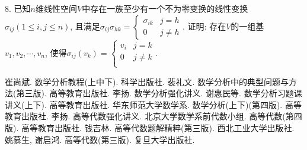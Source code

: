 \documentclass[12pt, a4paper, twoside]{ctexart}%
\begin{document}
	8. 已知$n$维线性空间$V$中存在一族至少有一个不为零变换的线性变换$\sigma_{ij}(1\leq i,j\leq n)$, 且满足$\sigma_{ij}\sigma_{hk}=\begin{cases}
		\sigma_{ik} &j=h\\
		0 &j\neq h
	\end{cases}$. 证明: 存在$V$的一组基$v_1,v_2,\cdots,v_n$, 使得$\sigma_{ij}(v_k)=\begin{cases}
	v_i &j=k\\
	0 &j\neq k\\
	\end{cases}$. \par 
	
	\clearpage

	\begin{thebibliography}{99}
		{\linespread{1.2}\selectfont
			 崔尚斌. 数学分析教程(上中下). 科学出版社. %
			 裴礼文. 数学分析中的典型问题与方法(第三版). 高等教育出版社.
			 李扬. 数学分析强化讲义.
			 谢惠民等. 数学分析习题课讲义(上下). 高等教育出版社. 
			 华东师范大学数学系. 数学分析(上下)(第四版). 高等教育出版社.
			 李扬. 高等代数强化讲义.
			 北京大学数学系前代数小组. 高等代数(第四版). 高等教育出版社. 
			 钱吉林. 高等代数题解精粹(第三版). 西北工业大学出版社.
			 姚慕生, 谢启鸿. 高等代数(第三版). 复旦大学出版社.
		}
	\end{thebibliography} 
	
	\clearpage
	
\end{document}
